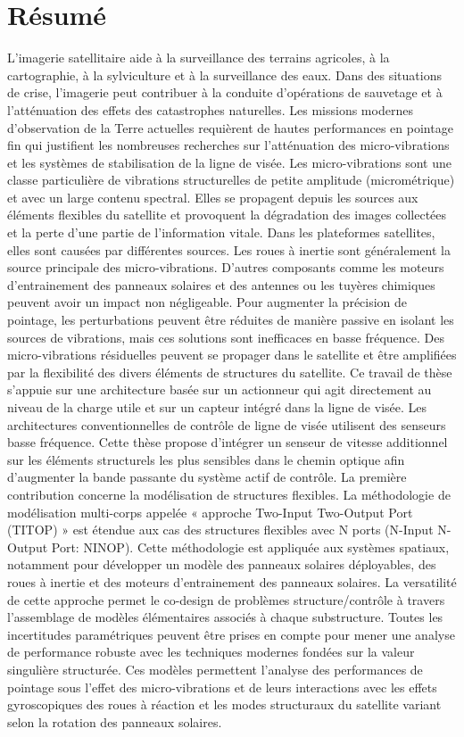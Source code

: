 \chapter*{R\'esum\'e}

 L’imagerie satellitaire aide à la surveillance des terrains agricoles, à la cartographie,  à la sylviculture et à la surveillance des eaux. Dans des situations de crise, l’imagerie peut contribuer à la conduite d’opérations de sauvetage et à l’atténuation des effets des catastrophes naturelles. 
Les missions modernes d’observation de la Terre actuelles requièrent de hautes performances en pointage fin qui justifient les nombreuses recherches sur l’atténuation des  micro-vibrations et les systèmes de stabilisation de la ligne de visée. Les micro-vibrations sont une classe particulière de vibrations structurelles de petite amplitude (micrométrique) et avec un large contenu spectral. Elles se propagent depuis les sources aux éléments flexibles du satellite et provoquent la dégradation des images collectées et la perte d’une partie de l’information vitale. Dans les plateformes satellites, elles sont causées par différentes sources. Les roues à inertie sont généralement la source principale des micro-vibrations.  D’autres composants comme les moteurs d’entrainement des panneaux solaires et des antennes ou les tuyères chimiques peuvent avoir un impact non négligeable.
Pour augmenter la précision de pointage, les perturbations peuvent être réduites de manière passive en isolant les sources de vibrations, mais ces solutions sont inefficaces en basse fréquence. Des micro-vibrations résiduelles peuvent se propager dans le satellite et être amplifiées par la flexibilité des divers éléments de structures du satellite.  Ce travail de thèse s’appuie sur une architecture basée sur un actionneur qui agit directement au niveau de la charge utile et sur un capteur intégré dans la ligne de visée.  Les architectures conventionnelles de contrôle de ligne de visée utilisent des senseurs basse fréquence. Cette thèse propose d’intégrer un senseur de vitesse additionnel sur les éléments structurels les plus sensibles dans le chemin optique afin d’augmenter la bande passante du système actif de contrôle. 
La première contribution concerne la modélisation de structures flexibles. La méthodologie de modélisation multi-corps appelée « approche Two-Input Two-Output Port (TITOP) » est étendue aux cas des structures flexibles avec N ports (N-Input N-Output Port: NINOP). Cette méthodologie est appliquée aux systèmes spatiaux, notamment pour développer un modèle des panneaux solaires déployables, des roues à inertie et des moteurs d’entrainement des panneaux solaires. La versatilité de cette approche permet le co-design de problèmes structure/contrôle à travers l’assemblage de modèles élémentaires associés à chaque substructure. Toutes les incertitudes paramétriques peuvent être prises en compte pour mener une analyse de performance robuste avec les techniques modernes fondées sur la valeur singulière structurée. Ces modèles permettent l’analyse des performances de pointage sous l’effet des micro-vibrations et de leurs interactions avec les effets gyroscopiques des roues à réaction et les modes structuraux du satellite variant selon la rotation des panneaux solaires.
